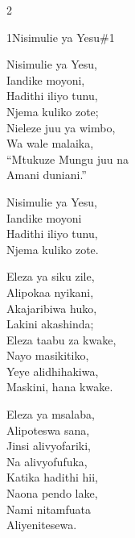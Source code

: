 \clearpage
\begin{multicols}{2}
\setlength{\columnseprule}{0.3pt}
\begin{hymn}{1}{Nisimulie ya Yesu}{\#1}
\begin{stanza}
Nisimulie ya Yesu,\\
Iandike moyoni,\\
Hadithi iliyo tunu,\\
Njema kuliko zote;\\
Nieleze juu ya wimbo,\\
Wa wale malaika,\\
``Mtukuze Mungu juu na\\
Amani duniani.''
\end{stanza}
\begin{chorus}
Nisimulie ya Yesu,\\
Iandike moyoni\\
Hadithi iliyo tunu,\\
Njema kuliko zote.
\end{chorus}
\begin{stanza}
Eleza ya siku zile,\\
Alipokaa nyikani,\\
Akajaribiwa huko,\\
Lakini akashinda;\\
Eleza taabu za kwake,\\
Nayo masikitiko,\\
Yeye alidhihakiwa,\\
Maskini, hana kwake.
\end{stanza}
\begin{stanza}
Eleza ya msalaba,\\
Alipoteswa sana,\\
Jinsi alivyofariki,\\
Na alivyofufuka,\\
Katika hadithi hii,\\
Naona pendo lake,\\
Nami nitamfuata\\
Aliyenitesewa.
\end{stanza}
\end{hymn}


\end{multicols}

